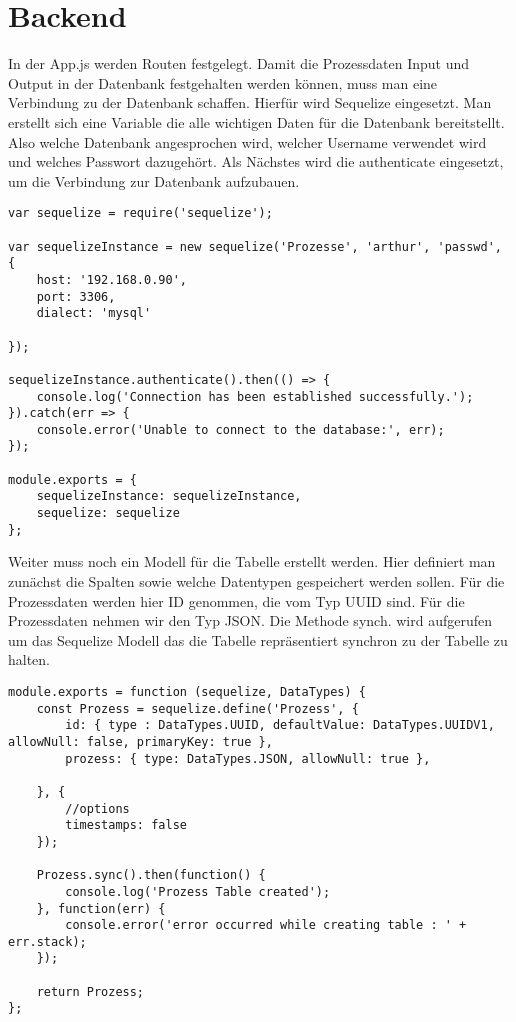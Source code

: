 \documentclass[a4paper,11pt]{scrreprt}
\begin{document}
\section{Backend}
In der App.js werden Routen festgelegt. Damit die Prozessdaten Input und Output in der Datenbank festgehalten werden können, muss man eine Verbindung zu der Datenbank schaffen. Hierfür wird Sequelize eingesetzt. 
Man erstellt sich eine Variable die alle wichtigen Daten für die Datenbank bereitstellt. Also welche Datenbank angesprochen wird, welcher Username verwendet wird und welches Passwort dazugehört. 
Als Nächstes wird die authenticate eingesetzt, um die Verbindung zur Datenbank aufzubauen.
 \begin{lstlisting}
var sequelize = require('sequelize');

var sequelizeInstance = new sequelize('Prozesse', 'arthur', 'passwd', {
    host: '192.168.0.90',
    port: 3306,
    dialect: 'mysql'
    
});

sequelizeInstance.authenticate().then(() => {
    console.log('Connection has been established successfully.');
}).catch(err => {
    console.error('Unable to connect to the database:', err);
});

module.exports = {
    sequelizeInstance: sequelizeInstance,
    sequelize: sequelize
};
\end{lstlisting}
Weiter muss noch ein Modell für die Tabelle erstellt werden. 
Hier definiert man zunächst die Spalten sowie welche Datentypen   gespeichert werden sollen. Für die Prozessdaten werden hier ID genommen, die vom Typ UUID sind. Für die Prozessdaten nehmen wir den Typ JSON. Die Methode synch. wird aufgerufen um das Sequelize Modell das die Tabelle repräsentiert synchron zu der Tabelle zu halten.
 \begin{lstlisting}
module.exports = function (sequelize, DataTypes) {
    const Prozess = sequelize.define('Prozess', {
        id: { type : DataTypes.UUID, defaultValue: DataTypes.UUIDV1,  allowNull: false, primaryKey: true },
        prozess: { type: DataTypes.JSON, allowNull: true },

    }, {
        //options
        timestamps: false
    });

    Prozess.sync().then(function() {
        console.log('Prozess Table created');
    }, function(err) {
        console.error('error occurred while creating table : ' + err.stack);
    });

    return Prozess;
};
\end{lstlisting}
\end{document}
